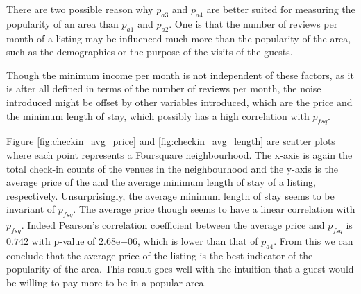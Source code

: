 There are two possible reason why $p_{a3}$ and $p_{a4}$ are better suited for measuring the popularity of an area than $p_{a1}$ and $p_{a2}$. One is that the number of reviews per month of a listing may be influenced much more than the popularity of the area, such as the demographics or the purpose of the visits of the guests.

Though the minimum income per month is not independent of these factors, as it is after all defined in terms of the number of reviews per month, the noise introduced might be offset by other variables introduced, which are the price and the minimum length of stay, which possibly has a high correlation with $p_{fsq}$.

Figure \ref{fig:checkin_avg_price} and \ref{fig:checkin_avg_length} are scatter plots where each point represents a Foursquare neighbourhood. The x-axis is again the total check-in counts of the venues in the neighbourhood and the y-axis is the average price of the and the average minimum length of stay of a listing, respectively. Unsurprisingly, the average minimum length of stay seems to be invariant of $p_{fsq}$. The average price though seems to have a linear correlation with $p_{fsq}$.  Indeed Pearson's correlation coefficient between the average price and $p_{fsq}$ is $0.742$ with p-value of $ 2.68\mathrm{e}{-06}$, which is lower than that of $p_{a4}$. 
From this we can conclude that the average price of the listing is the best indicator of the popularity of the area. This result goes well with the intuition that a guest would be willing to pay more to be in a popular area.

